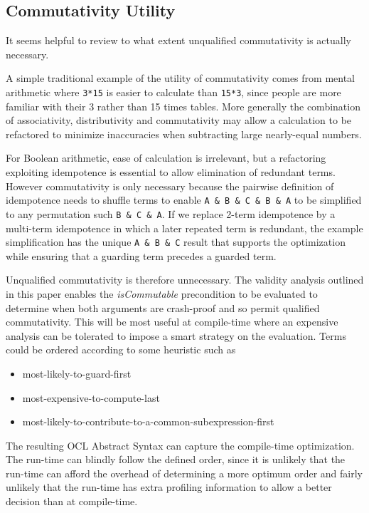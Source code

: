 \documentclass[
]{ceurart}
\begin{document}
\subsection{Commutativity Utility}

It seems helpful to review to what extent unqualified commutativity is actually necessary.

A simple traditional example of the utility of commutativity comes from mental arithmetic where \verb|3*15| is easier to calculate than \verb|15*3|, since people are more familiar with their 3 rather than 15 times tables. More generally the combination of associativity, distributivity and commutativity may allow a calculation to be refactored to minimize inaccuracies when subtracting large nearly-equal numbers.

For Boolean arithmetic, ease of calculation is irrelevant, but a refactoring exploiting idempotence is essential to allow elimination of redundant terms. However commutativity is only necessary because the pairwise definition of idempotence needs to shuffle terms to enable \verb|A & B & C & B & A| to be simplified to any permutation such \verb|B & C & A|. If we replace 2-term idempotence by a multi-term idempotence in which a later repeated term is redundant, the example simplification has the unique \verb|A & B & C| result that supports the optimization while ensuring that a guarding term precedes a guarded term.

Unqualified commutativity is therefore unnecessary. The validity analysis outlined in this paper enables the \emph{isCommutable} precondition to be evaluated to determine when both arguments are crash-proof and so permit qualified commutativity. This will be most useful at compile-time where an expensive analysis can be tolerated to impose a smart strategy on the evaluation. Terms could be ordered according to some heuristic such as

\begin{itemize}
	\item most-likely-to-guard-first
	\item most-expensive-to-compute-last
	\item most-likely-to-contribute-to-a-common-subexpression-first	
\end{itemize}

The resulting OCL Abstract Syntax can capture the compile-time optimization. The run-time can blindly follow the defined order, since it is unlikely that the run-time can afford the overhead of determining a more optimum order and fairly unlikely that the run-time has extra profiling information to allow a better decision than at compile-time.
\end{document}
